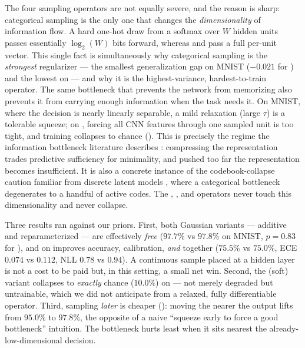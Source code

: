 The four sampling operators are not equally severe, and the reason is sharp: categorical
sampling is the only one that changes the \emph{dimensionality} of information flow. A hard
one-hot draw from a softmax over $W$ hidden units passes essentially $\log_2(W)$ bits
forward, whereas \gaussreparam{} and \bernoullist{} pass a full per-unit vector. This single
fact is simultaneously why categorical sampling is the \emph{strongest} regularizer --- the
smallest generalization gap on MNIST ($-0.021$ for \gumbelst{}) and the lowest \ece{} on
\cifar{} --- and why it is the highest-variance, hardest-to-train operator. The same
bottleneck that prevents the network from memorizing also prevents it from carrying enough
information when the task needs it. On MNIST, where the decision is nearly linearly
separable, a mild relaxation (large $\tau$) is a tolerable squeeze; on \cifar{}, forcing all
CNN features through one sampled unit is too tight, and training collapses to chance
(). This is precisely the regime the information bottleneck literature
describes \citep{tishby2015deep,alemi2017deepvib}: compressing the representation trades
predictive sufficiency for minimality, and pushed too far the representation becomes
insufficient. It is also a concrete instance of the codebook-collapse caution familiar from
discrete latent models \citep{oord2017vqvae}, where a categorical bottleneck degenerates to a
handful of active codes. The \detmode{}, \gaussreparam{}, and \bernoullist{} operators never
touch this dimensionality and never collapse.

Three results ran against our priors. First, both Gaussian variants --- additive
\gaussnoise{} and reparameterized \gaussreparam{} --- are effectively \emph{free}
($97.7\%$ vs $97.8\%$ on MNIST, $p=0.83$ for \gaussreparam{}), and on \cifar{}
\gaussreparam{} improves accuracy, calibration, \emph{and} \nll{} together ($75.5\%$ vs
$75.0\%$, ECE $0.074$ vs $0.112$, NLL $0.78$ vs $0.94$). A continuous sample placed at a
hidden layer is not a cost to be paid but, in this setting, a small net win. Second, the
\gumbelsoft{} (soft) variant collapses to \emph{exactly} chance ($10.0\%$) on \cifar{} ---
not merely degraded but untrainable, which we did not anticipate from a relaxed, fully
differentiable operator. Third, sampling \emph{later} is cheaper (): moving
the \samplinglayer{} nearer the output lifts \bernoullist{} from $95.0\%$ to $97.8\%$, the
opposite of a naive ``squeeze early to force a good bottleneck'' intuition. The bottleneck
hurts least when it sits nearest the already-low-dimensional decision.

